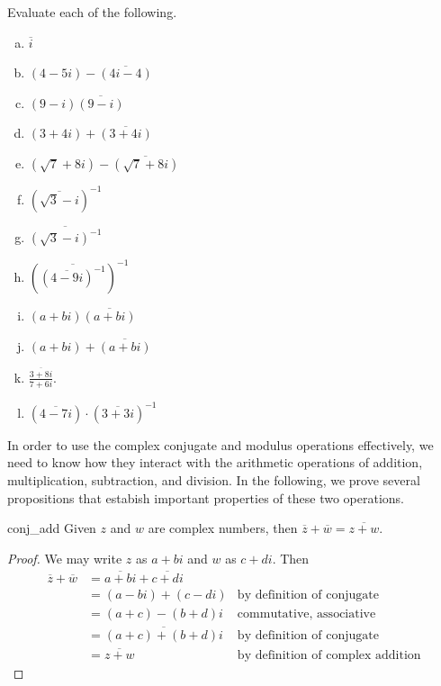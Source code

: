 \begin{exercise}{18}
Evaluate each of the following.
\begin{multicols}{2}
\begin{enumerate}[(a)]
\item
$\overline{i}$
\item
 $(4-5i)-\overline{(4i -4)}$
\item
$(9-i) \overline{(9-i)}$
\item
$(3+4i)+\overline{(3+4i)}$
\item
$(\sqrt{7}+8i)-\overline{(\sqrt{7}+8i)}$
\item 
$\left({\overline{\sqrt{3} -i}}\right)^{-1}$
\item 
$\overline{\left(\sqrt{3} -i\right)^{-1}}$
\item 
$\left( \overline{\left({\overline{4 -9i}}\right)^{-1}} \right) ^{-1}$
\item
$(a + bi)\overline{(a+bi)}$
\item
$(a + bi) + \overline{(a+bi)}$
\item
$\frac{ \overline{3 + 8i} }{7 + 6i}$.
\item
$( \overline{4 -7i} ) \cdot (\overline{3 + 3i})^{-1}$
\end{enumerate}
\end{multicols}
\end{exercise}

In order to use the complex conjugate and modulus operations effectively, we need to know how they interact with the arithmetic operations of addition, multiplication, subtraction, and division. In the following, we prove several propositions that estabish important properties of these two operations. 

\begin{prop}{conj_add} Given $z$ and $w$ are complex numbers, then $\overline{z} + \overline{w} = \overline{z + w}$.
\end{prop}
\begin{proof}
We may write $z$ as $a + bi$ and $w$ as $c + di$. Then
\begin{align*}
\overline{z} + \overline{w} &= \overline{a + bi} + \overline{c + di} \\
& = (a - bi) + (c - di) & \textrm{by~definition~of~conjugate}\\
& = (a + c) - (b + d)i & \textrm{commutative, associative }\\
& = \overline{(a + c) + (b + d)i} & \textrm{by~definition~of~conjugate}\\
& = \overline{z + w} & \textrm{by~definition~of~complex~addition}
\end{align*}
\end{proof}


